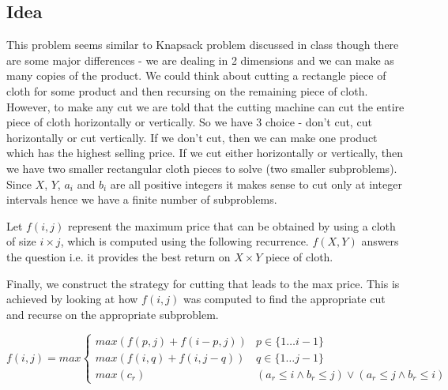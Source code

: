 \documentclass{article}
\begin{document}
    \subsection*{Idea}
    This problem seems similar to Knapsack problem discussed in class though there are some major differences - we are dealing in 2 dimensions and we can make as many copies of the product. We could think about cutting a rectangle piece of cloth for some product and then recursing on the remaining piece of cloth. However, to make any cut we are told that the cutting machine can cut the entire piece of cloth horizontally or vertically. So we have 3 choice - don't cut, cut horizontally or cut vertically. If we don't cut, then we can make one product which has the highest selling price. If we cut either horizontally or vertically, then we have two smaller rectangular cloth pieces to solve (two smaller subproblems). Since $X$, $Y$, $a_i$ and $b_i$ are all positive integers it makes sense to cut only at integer intervals hence we have a finite number of subproblems.

    Let $f(i, j)$ represent the maximum price that can be obtained by using a cloth of size $i \times j$, which is computed using the following recurrence. $f(X, Y)$ answers the question i.e. it provides the best return on $X \times Y$ piece of cloth.

    Finally, we construct the strategy for cutting that leads to the max price. This is achieved by looking at how $f(i, j)$ was computed to find the appropriate cut and recurse on the appropriate subproblem.

    \begin{equation*}
        f(i, j) = max
        \begin{cases}
            max(f(p, j) + f(i-p, j))    & \text{$p \in \{1 \dots i-1\}$} \\
            max(f(i, q) + f(i, j-q))    & \text{$q \in \{1 \dots j-1\}$} \\
            max(c_r)                    & \text{$(a_r \le i \land b_r \le j) \lor (a_r \le j \land b_r \le i)$}
        \end{cases}
    \end{equation*}
\end{document}
